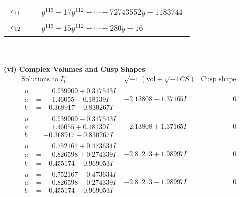 \documentclass[1p]{elsarticle_modified}
\theoremstyle{definition}
\newcommand{\I}{\sqrt{-1}}
\begin{document}
\begin{tabular}{m{50pt}|m{274pt}}
\hline $$\begin{aligned}c_{11}\end{aligned}$$&$\begin{aligned}
&y^{113}-17 y^{112}+\cdots+72743552 y-1183744
\end{aligned}$\\
\hline $$\begin{aligned}c_{12}\end{aligned}$$&$\begin{aligned}
&y^{113}+15 y^{112}+\cdots-280 y-16
\end{aligned}$\\
\hline
\end{tabular}\\~\\
\newpage\flushleft \textbf{(vi) Complex Volumes and Cusp Shapes}
$$\begin{array}{c|c|c}  
\text{Solutions to }I^u_{1}& \I (\text{vol} + \sqrt{-1}CS) & \text{Cusp shape}\\
 \hline 
\begin{aligned}
u &= \phantom{-}0.939909 + 0.317543 I \\
a &= \phantom{-}1.46055 - 0.18139 I \\
b &= -0.368917 + 0.830267 I\end{aligned}
 & -2.13808 - 1.37165 I & \phantom{-0.000000 } 0 \\ \hline\begin{aligned}
u &= \phantom{-}0.939909 - 0.317543 I \\
a &= \phantom{-}1.46055 + 0.18139 I \\
b &= -0.368917 - 0.830267 I\end{aligned}
 & -2.13808 + 1.37165 I & \phantom{-0.000000 } 0 \\ \hline\begin{aligned}
u &= \phantom{-}0.752167 + 0.473634 I \\
a &= \phantom{-}0.826598 + 0.274339 I \\
b &= -0.455174 - 0.969053 I\end{aligned}
 & -2.81213 + 1.98997 I & \phantom{-0.000000 } 0 \\ \hline\begin{aligned}
u &= \phantom{-}0.752167 - 0.473634 I \\
a &= \phantom{-}0.826598 - 0.274339 I \\
b &= -0.455174 + 0.969053 I\end{aligned}
 & -2.81213 - 1.98997 I & \phantom{-0.000000 } 0 \\ \hline\begin{aligned}

\end{aligned}
\end{array}$$
\end{document}
